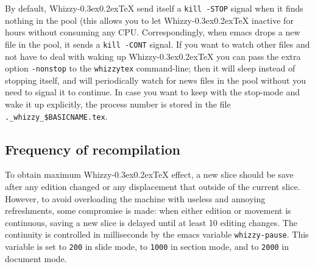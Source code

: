 \documentclass{article}
\makeatletter
\let \lst \verb
\def \whizzy {{Whizzy\kern -0.3ex\raise 0.2ex\hbox{\let \@\relax\TeX}}}
\makeatother
\begin{document}
By default, {\whizzy} send itself a \lst"kill -STOP" signal when it finds
nothing in the pool (this allows you to let {\whizzy} inactive for hours
without consuming any CPU. Correspondingly, when emacs drops a new file in
the pool, it sends a \lst"kill -CONT" signal. If you want to watch other
files and not have to deal with waking up {\whizzy} you can pass the extra
option \lst"-nonstop" to the \lst"whizzytex" command-line; then it will sleep
instead of stopping itself, and will periodically watch for news files 
in the pool without you need to signal it to continue. 
In case you want to keep with the stop-mode and wake it up explicitly, the
process number is stored in the file \lst"._whizzy_$BASICNAME.tex". %

\subsection {Frequency of recompilation} 

To obtain maximum {\whizzy} effect, a new slice should be save after any
edition changed or any displacement that outside of the current slice.
However, to avoid overloading the machine with useless and annoying
refreshments, some compromise is made: when either edition or movement
is continuous, saving a new slice is delayed until at least 10 editing
changes. The continuity is controlled in milliseconds by the emacs variable
\lst"whizzy-pause". This variable is set to \lst"200" in slide
mode, to \lst"1000" in section mode, and to \lst"2000" in document mode.
\end{document}
